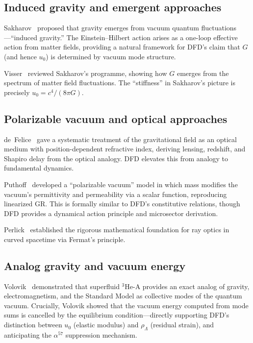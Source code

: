 \documentclass[aps,prd,twocolumn,superscriptaddress,nofootinbib]{revtex4-2}
\begin{document}
\subsection{Induced gravity and emergent approaches}

Sakharov~\cite{Sakharov1967} proposed that gravity emerges from vacuum
quantum fluctuations---``induced gravity.''  The Einstein--Hilbert
action arises as a one-loop effective action from matter fields,
providing a natural framework for DFD's claim that $G$ (and hence
$u_0$) is determined by vacuum mode structure.

Visser~\cite{Visser2002} reviewed Sakharov's programme, showing how
$G$ emerges from the spectrum of matter field fluctuations.  The
``stiffness'' in Sakharov's picture is precisely
$u_0 = c^4/(8\pi G)$.

\subsection{Polarizable vacuum and optical approaches}

de~Felice~\cite{deFelice1971} gave a systematic treatment of the
gravitational field as an optical medium with position-dependent
refractive index, deriving lensing, redshift, and Shapiro delay from
the optical analogy.  DFD elevates this from analogy to fundamental
dynamics.

Puthoff~\cite{Puthoff2002} developed a ``polarizable vacuum'' model
in which mass modifies the vacuum's permittivity and permeability via
a scalar function, reproducing linearized GR\@.  This is formally
similar to DFD's constitutive relations, though DFD provides a
dynamical action principle and microsector derivation.

Perlick~\cite{Perlick2000} established the rigorous mathematical
foundation for ray optics in curved spacetime via Fermat's principle.

\subsection{Analog gravity and vacuum energy}

Volovik~\cite{Volovik2003} demonstrated that superfluid $^3$He-A
provides an exact analog of gravity, electromagnetism, and the
Standard Model as collective modes of the quantum vacuum.  Crucially,
Volovik showed that the vacuum energy computed from mode sums is
cancelled by the equilibrium condition---directly supporting DFD's
distinction between $u_0$ (elastic modulus) and $\rho_\Lambda$
(residual strain), and anticipating the $\alpha^{57}$ suppression
mechanism.
\end{document}
